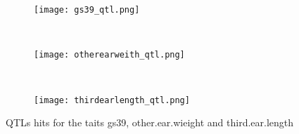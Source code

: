 \documentclass{frontiersSCNS} %
\begin{document}
\begin{figure}
    \begin{center}
    \begin{subfigure}[b]{1\textwidth}
        \texttt{[image: gs39\_qtl.png]}
        \caption{}
    \end{subfigure}
    ~ %
\begin{subfigure}[b]{1\textwidth}
        \texttt{[image: otherearweith\_qtl.png]}
        \caption{}
    \end{subfigure}
    ~ %
    \begin{subfigure}[b]{1\textwidth}
        \texttt{[image: thirdearlength\_qtl.png]}
        \caption{}
    \end{subfigure}
\end{center}
    \caption{QTLs hits for the taits gs39, other.ear.wieight and third.ear.length}\label{fig4}


\end{figure}





\end{document}
